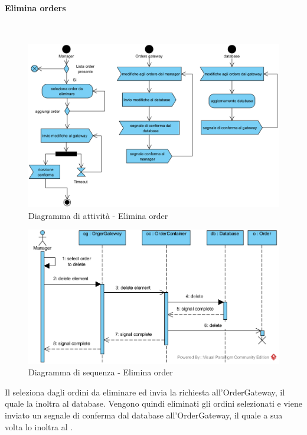 \begin{samepage}
	\paragraph{Elimina orders}\mbox{}\\
	\begin{figure}[H]
		\centering
		\includegraphics[width=14cm]{diagrammi_img/attivita/manager_order_remove.png}
		\caption{Diagramma di attività - Elimina order}
	\end{figure}
\end{samepage}
\begin{figure}[H]
	\centering
	\includegraphics[width=14cm]{diagrammi_img/sequenza/direttore_elimina_orders.png}
	\caption{Diagramma di sequenza - Elimina order}
\end{figure}
Il \Manager{} seleziona dagli ordini da eliminare ed invia la richiesta all'Order\-Gateway, il quale la inoltra al database. Vengono quindi eliminati gli ordini selezionati e viene inviato un segnale di conferma dal database all'Order\-Gateway, il quale a sua volta lo inoltra al \Manager{}.
